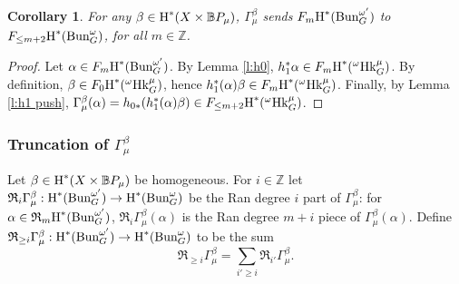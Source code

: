 \documentclass[reqno]{amsart}
\numberwithin{equation}{subsection}
\newtheorem{cor}[subsubsection]{Corollary}
\theoremstyle{definition}
\def\BB{\mathbb{B}}
\def\ZZ{\mathbb{Z}}
\newcommand\frR{\mathfrak{R}}
\newcommand{\Bun}{\textup{Bun}}
\newcommand\Hk{\mathrm{Hk}}
\newcommand{\cohog}[2]{\textup{H}^{#1}({#2})}     %
\renewcommand\a\alpha
\renewcommand\b\beta
\newcommand\G\Gamma
\newcommand{\om}{\omega}
\begin{document}
\begin{cor}\label{c:Gamma increase Ran by 2} For any $\b\in\cohog{*}{X\times \BB P_\mu}$, $\G^{\b}_\mu$ sends $F_m\cohog{*}{\Bun_G^{\om'}}$ to $F_{\le m+2}\cohog{*}{\Bun_G^{\om}}$, for all $m\in\ZZ$. 
\end{cor}
\begin{proof}
Let $\a\in F_m\cohog{*}{\Bun_G^{\om'}}$. By Lemma \ref{l:h0}, $h_1^*\a\in F_{m}\cohog{*}{^\om\Hk_G^{\mu}}$. By definition, $\b\in F_{0}\cohog{*}{^\om\Hk_G^{\mu}}$, hence $h_1^*(\a)\b\in F_{m}\cohog{*}{^\om\Hk_G^{\mu}}$. Finally, by Lemma \ref{l:h1 push}, $\G^\b_\mu(\a)=h_{0*}(h_1^*(\a)\b)\in F_{\le m+2}\cohog{*}{^\om\Hk_G^{\mu}}$.
\end{proof}


\subsubsection{Truncation of $\G^\b_\mu$} Let $\b\in \cohog{*}{X\times \BB P_\mu}$ be homogeneous. For $i\in \ZZ$ let $\frR_{i}\G^{\b}_\mu: \cohog{*}{\Bun_G^{\om'}}\to \cohog{*}{\Bun_G^{\om}}$ be the Ran degree $i$ part of $\G^\b_\mu$: for $\a\in \frR_m \cohog{*}{\Bun_G^{\om'}}$, $\frR_i\G^\b_\mu(\a)$ is the Ran degree $m+i$ piece of $\G^\b_\mu(\a)$. Define $\frR_{\ge i}\G^{\b}_\mu: \cohog{*}{\Bun_G^{\om'}}\to \cohog{*}{\Bun_G^{\om}}$ to be the sum
\begin{equation*}
\frR_{\ge i}\G^{\b}_\mu=\sum_{i'\ge i}\frR_{i'}\G^{\b}_\mu.
\end{equation*}
\end{document}
